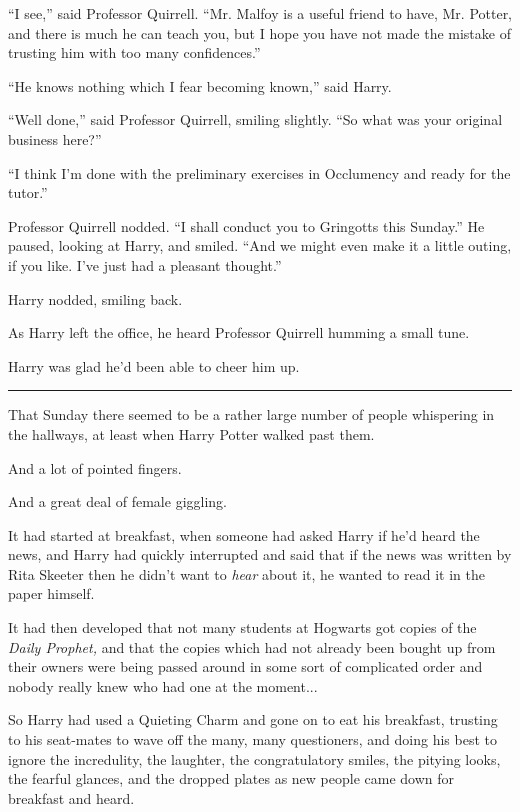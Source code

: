 ``I see,'' said Professor Quirrell. ``Mr. Malfoy is a useful friend to have, Mr. Potter, and there is much he can teach you, but I hope you have not made the mistake of trusting him with too many confidences.''

``He knows nothing which I fear becoming known,'' said Harry.

``Well done,'' said Professor Quirrell, smiling slightly. ``So what was your original business here?''

``I think I'm done with the preliminary exercises in Occlumency and ready for the tutor.''

Professor Quirrell nodded. ``I shall conduct you to Gringotts this Sunday.'' He paused, looking at Harry, and smiled. ``And we might even make it a little outing, if you like. I've just had a pleasant thought.''

Harry nodded, smiling back.

As Harry left the office, he heard Professor Quirrell humming a small tune.

Harry was glad he'd been able to cheer him up.

\begin{center}\rule{3in}{0.4pt}\end{center}

That Sunday there seemed to be a rather large number of people whispering in the hallways, at least when Harry Potter walked past them.

And a lot of pointed fingers.

And a great deal of female giggling.

It had started at breakfast, when someone had asked Harry if he'd heard the news, and Harry had quickly interrupted and said that if the news was written by Rita Skeeter then he didn't want to \emph{hear} about it, he wanted to read it in the paper himself.

It had then developed that not many students at Hogwarts got copies of the \emph{Daily Prophet,} and that the copies which had not already been bought up from their owners were being passed around in some sort of complicated order and nobody really knew who had one at the moment...

So Harry had used a Quieting Charm and gone on to eat his breakfast, trusting to his seat-mates to wave off the many, many questioners, and doing his best to ignore the incredulity, the laughter, the congratulatory smiles, the pitying looks, the fearful glances, and the dropped plates as new people came down for breakfast and heard.

